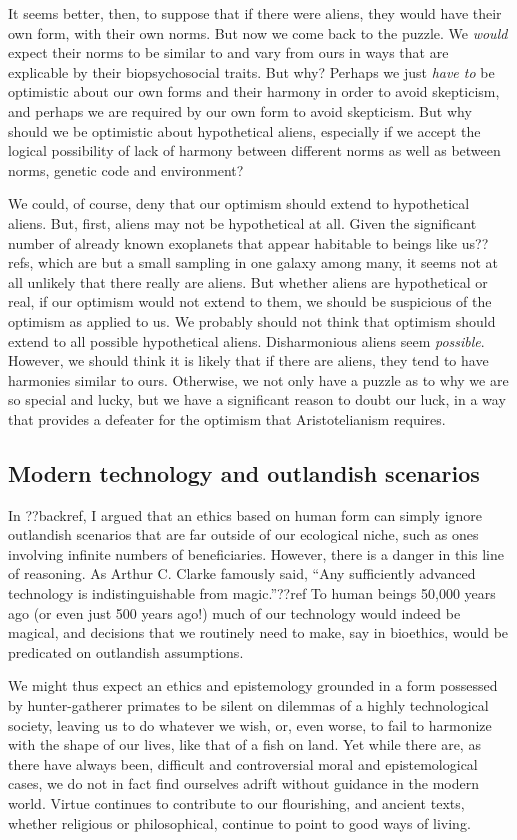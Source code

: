 It seems better, then, to suppose that if there were aliens, they would have their own form, with their own norms.
But now we come back to the puzzle. We \textit{would} expect their norms to be similar to and vary from ours in ways
that are explicable by their biopsychosocial traits. But why? Perhaps we just \textit{have to} be optimistic about 
our own forms and their harmony in order to avoid skepticism, and perhaps we are required by our own form to avoid 
skepticism. But why should we be optimistic about hypothetical aliens, especially if we accept the logical possibility
of lack of harmony between different norms as well as between norms, genetic code and environment? 

We could, of course, deny that our optimism should extend to hypothetical aliens. But, first, aliens may not be
hypothetical at all. Given the significant number of already known exoplanets that appear habitable to beings like 
us??refs, which are but a small sampling in one galaxy among many, it seems not at all unlikely that there really
are aliens. But whether aliens are hypothetical or real, if our optimism would not extend to them, we should be
suspicious of the optimism as applied to us. We probably should not think that optimism should extend to all possible hypothetical aliens. Disharmonious
aliens seem \textit{possible}. However, we should think it is likely that if there are aliens, they tend to have 
harmonies similar to ours. Otherwise, we not only have a puzzle as to why we are so special and lucky, but we have
a significant reason to doubt our luck, in a way that provides a defeater for the optimism that Aristotelianism
requires.


\subsection{Modern technology and outlandish scenarios}
In ??backref, I argued that an ethics based on human form can simply ignore outlandish scenarios
that are far outside of our ecological niche, such as ones involving infinite numbers of
beneficiaries. However, there is a danger in this line of reasoning. As Arthur C. Clarke famously
said, ``Any sufficiently advanced technology is indistinguishable from magic.''??ref To human beings
50,000 years ago (or even just 500 years ago!) much of our technology would indeed be magical, and 
decisions that we routinely need to make, say in bioethics, would be predicated on outlandish assumptions. 

We might thus expect an ethics and epistemology grounded in a form possessed by hunter-gatherer primates
to be silent on dilemmas of a highly technological society, leaving us to do whatever we wish, or, even worse, 
to fail to harmonize with the shape of our lives, like that of a fish on land. Yet while there are, as there 
have always been, difficult and controversial moral and epistemological cases, we do not in fact find 
ourselves adrift without guidance in the modern world. Virtue continues to contribute to our flourishing,
and ancient texts, whether religious or philosophical, continue to point to good ways of living. 

